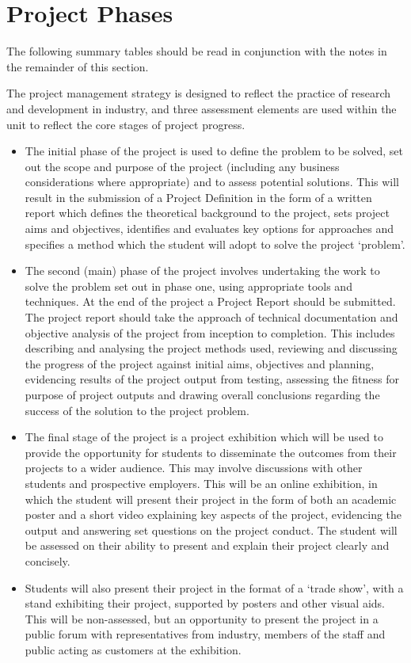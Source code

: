 \chapter{Project Phases}

The following summary tables should be read in conjunction with the notes in the remainder of this section.

The project management strategy is designed to reflect the practice of research and development in industry, and three assessment elements are used within the unit to reflect the core stages of project progress.

\begin{itemize}
    \item The initial phase of the project is used to define the problem to be solved, set out the scope and purpose of the project (including any business considerations where appropriate) and to assess potential solutions. This will result in the submission of a Project Definition in the form of a written report which defines the theoretical background to the project, sets project aims and objectives, identifies and evaluates key options for approaches and specifies a method which the student will adopt to solve the project ‘problem’.
    \item The second (main) phase of the project involves undertaking the work to solve the problem set out in phase one, using appropriate tools and techniques. At the end of the project a Project Report should be submitted. The project report should take the approach of technical documentation and objective analysis of the project from inception to completion. This includes describing and analysing the project methods used, reviewing and discussing the progress of the project against initial aims, objectives and planning, evidencing results of the project output from testing, assessing the fitness for purpose of project outputs and drawing overall conclusions regarding the success of the solution to the project problem.
    \item The final stage of the project is a project exhibition which will be used to provide the opportunity for students to disseminate the outcomes from their projects to a wider audience. This may involve discussions with other students and prospective employers. This will be an online exhibition, in which the student will present their project in the form of both an academic poster and a short video explaining key aspects of the project, evidencing the output and answering set questions on the project conduct. The student will be assessed on their ability to present and explain their project clearly and concisely.
    \item Students will also present their project in the format of a ‘trade show’, with a stand exhibiting their project, supported by posters and other visual aids. This will be non-assessed, but an opportunity to present the project in a public forum with representatives from industry, members of the staff and public acting as customers at the exhibition.
\end{itemize}


